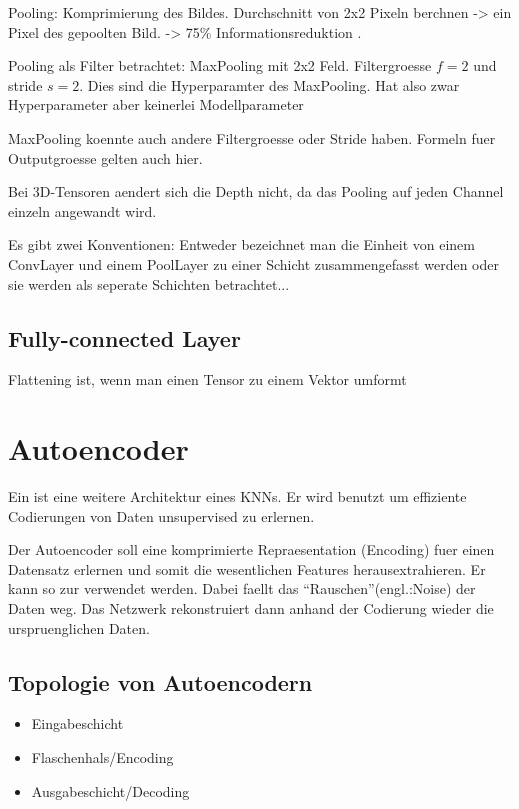 Pooling:
Komprimierung des Bildes. Durchschnitt von 2x2 Pixeln berchnen -> ein Pixel des
gepoolten Bild. -> 75\% Informationsreduktion .

Pooling als Filter betrachtet:
MaxPooling mit 2x2 Feld. Filtergroesse $f=2$ und stride $s=2$. Dies sind die
Hyperparamter des MaxPooling. Hat also zwar Hyperparameter aber keinerlei Modellparameter

MaxPooling koennte auch andere Filtergroesse oder Stride haben. Formeln fuer
Outputgroesse gelten auch hier.

Bei 3D-Tensoren aendert sich die Depth nicht, da das Pooling auf jeden Channel
einzeln angewandt wird.


Es gibt zwei Konventionen:
Entweder bezeichnet man die Einheit von einem ConvLayer und einem PoolLayer zu
einer Schicht zusammengefasst werden oder sie werden als seperate Schichten betrachtet...

\section{Fully-connected Layer}
Flattening ist, wenn man einen Tensor zu einem Vektor umformt



\pagebreak
\chapter{Autoencoder}
Ein  ist eine weitere Architektur eines KNNs. Er wird
benutzt um effiziente Codierungen von Daten unsupervised zu erlernen.

Der Autoencoder soll eine komprimierte Repraesentation (Encoding) fuer einen
Datensatz erlernen und somit die wesentlichen Features herausextrahieren. Er
kann so zur  verwendet werden. Dabei faellt
das ``Rauschen''(engl.:Noise) der Daten weg. Das Netzwerk rekonstruiert dann
anhand der Codierung wieder die urspruenglichen Daten.



\section{Topologie von Autoencodern}

\begin{itemize}
\item{Eingabeschicht}
\item{Flaschenhals/Encoding}
\item{Ausgabeschicht/Decoding}
\end{itemize}

